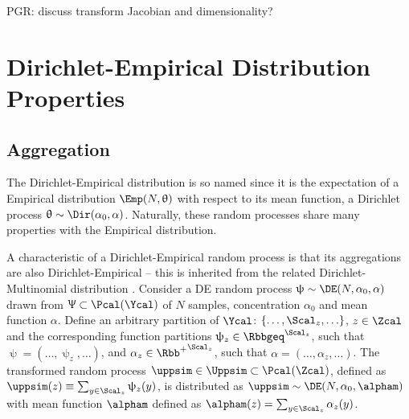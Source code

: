 \documentclass[12pt]{report}
\begin{document}
PGR: discuss transform Jacobian and dimensionality? 










\section{Dirichlet-Empirical Distribution Properties} 
\label{app:DE}

\subsection{Aggregation}

The Dirichlet-Empirical distribution is so named since it is the expectation of a Empirical distribution $\Emp(N,\uptheta)$ with respect to its mean function, a Dirichlet process $\uptheta \sim \Dir(\alpha_0, \alpha)$. Naturally, these random processes share many properties with the Empirical distribution.

A characteristic of a Dirichlet-Empirical random process is that its aggregations are also Dirichlet-Empirical -- this is inherited from the related Dirichlet-Multinomial distribution \cite{johnson}. Consider a DE random process $\uppsi \sim \DE(N,\alpha_0,\alpha)$ drawn from $\Uppsi \subset \Pcal(\Ycal)$ of $N$ samples, concentration $\alpha_0$ and mean function $\alpha$. Define an arbitrary partition of $\Ycal$: $\left\{ \ldots,\Scal_z,\ldots \right\}$, $z \in \Zcal$ and the corresponding function partitions $\uppsi_z \in \Rbbgeq^{\Scal_z}$, such that $\uppsi = \left( \ldots,\uppsi_z,\ldots \right)$, and $\alpha_z \in {\Rbb^+}^{\Scal_z}$, such that $\alpha = \left( \ldots,\alpha_z,\ldots \right)$. The transformed random process $\uppsim \in \Uppsim \subset \Pcal(\Zcal)$, defined as $\uppsim(z) \equiv \sum_{y \in \Scal_z} \uppsi_z(y)$, is distributed as $\uppsim \sim \DE(N,\alpha_0,\alpham)$ with mean function $\alpham$ defined as $\alpham(z) = \sum_{y \in \Scal_z} \alpha_z(y)$.
\end{document}
